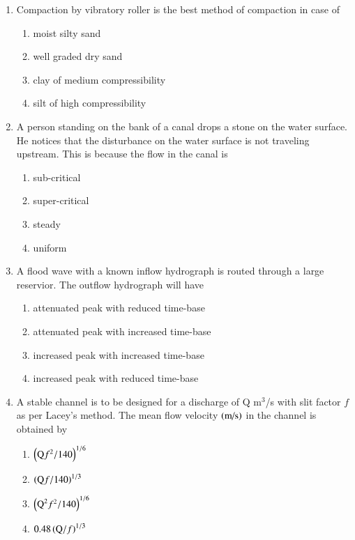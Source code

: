 \documentclass[journal,12pt,onecolumn]{IEEEtran}
\theoremstyle{remark}
\begin{document}
\begin{enumerate}
\item Compaction by vibratory roller is the best method of compaction in case of

\begin{enumerate}
	\item moist silty sand
	\item well graded dry sand
	\item clay of medium compressibility
	\item silt of high compressibility
\end{enumerate}

\item A person standing on the bank of a canal drops a stone on the water surface. He notices that the disturbance on the water surface is not traveling upstream. This is because the flow in the canal is

\begin{enumerate}
	\item sub-critical
	\item super-critical
	\item steady
	\item uniform
\end{enumerate}

\item A flood wave with a known inflow hydrograph is routed through a large reservior. The outflow hydrograph will have

\begin{enumerate}
	\item attenuated peak with reduced time-base
	\item attenuated peak with increased time-base
	\item increased peak with increased time-base
	\item increased peak with reduced time-base
\end{enumerate}

\item A stable channel is to be designed for a discharge of Q m$^3$/s with slit factor $f$ as per Lacey's method. The mean flow velocity $\left(\text{m/s}\right)$ in the channel is obtained by

\begin{enumerate}
	\item $\left(\text{Q}f^2/140\right)^{1/6}$
	\item $\left(\text{Q}f/140\right)^{1/3}$
	\item $\left(\text{Q}^2f^2/140\right)^{1/6}$
	\item $0.48\left(\text{Q}/f\right)^{1/3}$
\end{enumerate}


\end{enumerate}
\end{document}
